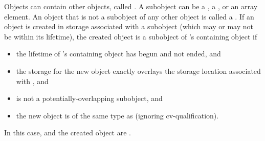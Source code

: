 \pnum
{}%
Objects can contain other objects, called .
A subobject can be
a , a ,
or an array element.
%
An object that is not a subobject of any other object is called a .
If an object is created
in storage associated with a subobject 
(which may or may not be within its lifetime),
the created object
is a subobject of 's containing object if
\begin{itemize}
\item
the lifetime of 's containing object has begun and not ended, and
\item
the storage for the new object exactly overlays the storage location associated with , and
\item
{} is not a potentially-overlapping subobject, and
\item
the new object is of the same type as  (ignoring cv-qualification).
\end{itemize}
In this case,  and the created object are
.

